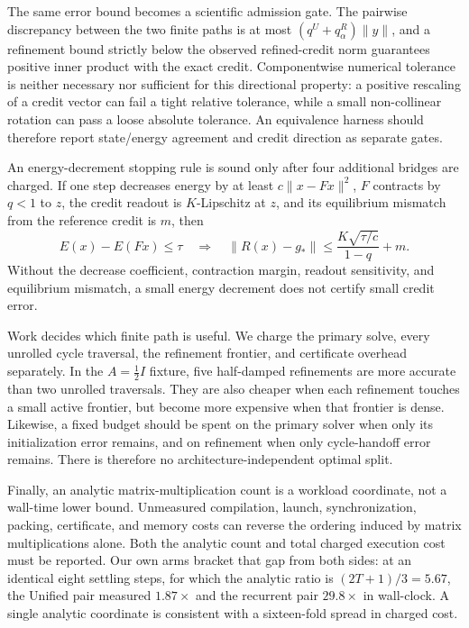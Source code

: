 \documentclass[11pt]{article}
\begin{document}
The same error bound becomes a scientific admission gate.  The pairwise discrepancy
between the two finite paths is at most $(q^U+q_\alpha^R)\|y\|$, and a refinement bound
strictly below the observed refined-credit norm guarantees positive inner product with
the exact credit.  Componentwise numerical tolerance is neither necessary nor
sufficient for this directional property: a positive rescaling of a credit vector can
fail a tight relative tolerance, while a small non-collinear rotation can pass a loose
absolute tolerance.  An equivalence harness should therefore report state/energy
agreement and credit direction as separate gates.

An energy-decrement stopping rule is sound only after four additional bridges are
charged.  If one step decreases energy by at least $c\|x-Fx\|^2$, $F$ contracts by
$q<1$ to $z$, the credit readout is $K$-Lipschitz at $z$, and its equilibrium mismatch
from the reference credit is $m$, then
\[
  E(x)-E(Fx)\le\tau
  \quad\Longrightarrow\quad
  \|R(x)-g_*\|
  \le \frac{K\sqrt{\tau/c}}{1-q}+m.
\]
Without the decrease coefficient, contraction margin, readout sensitivity, and
equilibrium mismatch, a small energy decrement does not certify small credit error.

Work decides which finite path is useful.  We charge the primary solve, every unrolled
cycle traversal, the refinement frontier, and certificate overhead separately.  In the
$A=\tfrac12 I$ fixture, five half-damped refinements are more accurate than two
unrolled traversals.  They are also cheaper when each refinement touches a small active
frontier, but become more expensive when that frontier is dense.  Likewise, a fixed
budget should be spent on the primary solver when only its initialization error remains,
and on refinement when only cycle-handoff error remains.  There is therefore no
architecture-independent optimal split.

Finally, an analytic matrix-multiplication count is a workload coordinate, not a
wall-time lower bound.  Unmeasured compilation, launch, synchronization, packing,
certificate, and memory costs can reverse the ordering induced by matrix multiplications
alone.  Both the analytic count and total charged execution cost must be reported.  Our
own arms bracket that gap from both sides: at an identical eight settling steps, for
which the analytic ratio is $(2T+1)/3=5.67$, the Unified pair measured $1.87\times$ and
the recurrent pair $29.8\times$ in wall-clock.  A single analytic coordinate is
consistent with a sixteen-fold spread in charged cost.
\end{document}
